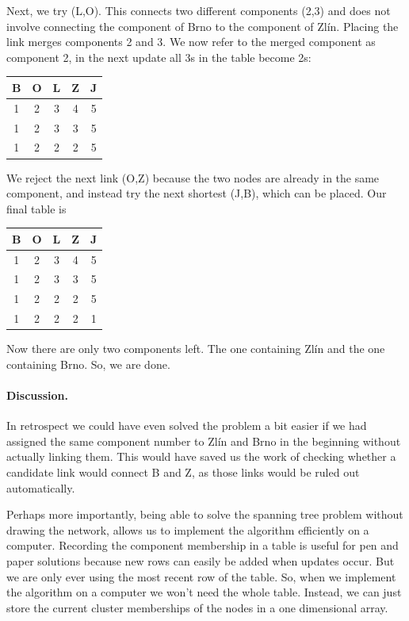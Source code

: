Next, we try (L,O). This connects two different components (2,3) and does not involve connecting the component of Brno to the component of Zlín. Placing the link merges components 2 and 3. We now refer to the merged component as component 2, in the next update all 3s in the table become 2s:
\begin{center}
\begin{tabular}{c c c c c}
B & O & L & Z & J \\\hline
1 & 2 & 3 & 4 & 5 \\
1 & 2 & 3 & 3 & 5 \\
1 & 2 & 2 & 2 & 5 
\end{tabular}
\end{center}
We reject the next link (O,Z) because the two nodes are already in the same component, and instead try the next shortest (J,B), which can be placed. Our final table is 
\begin{center}
\begin{tabular}{c c c c c}
B & O & L & Z & J \\\hline
1 & 2 & 3 & 4 & 5 \\
1 & 2 & 3 & 3 & 5 \\
1 & 2 & 2 & 2 & 5 \\
1 & 2 & 2 & 2 & 1 
\end{tabular}
\end{center}
Now there are only two components left. The one containing Zlín and the one containing Brno. So, we are done. 

\paragraph{Discussion.}In retrospect we could have even solved the problem a bit easier if we had assigned the same component number to Zlín and Brno in the beginning without actually linking them. This would have saved us the work of checking whether a candidate link would connect B and Z, as those links would be ruled out automatically. 

Perhaps more importantly, being able to solve the spanning tree problem without drawing the network, allows us to implement the algorithm efficiently on a computer. Recording the component membership in a table is useful for pen and paper solutions because new rows can easily be added when updates occur. But we are only ever using the most recent row of the table. So, when we implement the algorithm on a computer we won't need the whole table. Instead, we can just store the current cluster memberships of the nodes in a one dimensional array.  



